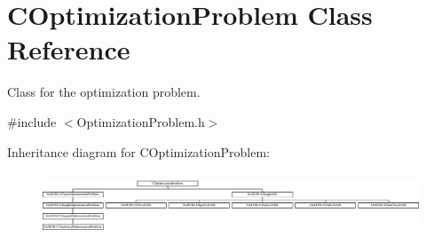 \hypertarget{class_c_optimization_problem}{\section{C\-Optimization\-Problem Class Reference}
\label{class_c_optimization_problem}
}


Class for the optimization problem.  




{\ttfamily \#include $<$Optimization\-Problem.\-h$>$}

Inheritance diagram for C\-Optimization\-Problem\-:\begin{figure}[H]
\begin{center}
\leavevmode
\includegraphics[height=1.881720cm]{class_c_optimization_problem}
\end{center}
\end{figure}
